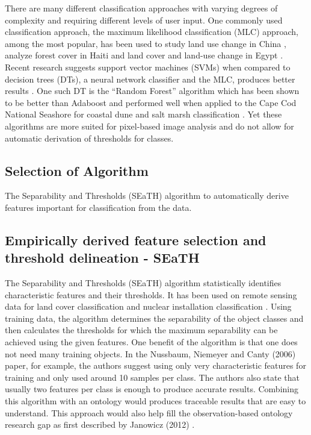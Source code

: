 \documentclass[a4paper,12pt]{article}
\begin{document}
There are many different classification approaches with varying degrees of
complexity and requiring different levels of user input. One commonly used
classification approach, the maximum likelihood classification (MLC) approach,
among the most popular, has been used to study land use change in China
\cite{Ding2007}, analyze forest cover in Haiti \cite{Churches2014} and land
cover and land-use change in Egypt \cite{Shalaby2007}. Recent research suggests
support vector machines (SVMs) when compared to decision trees (DTs), a neural
network classifier and the MLC, produces better results \cite{Huang2002}. One
such DT is the ``Random Forest'' algorithm which has been shown to be better
than Adaboost \cite{Chan2008} and performed well when applied to the Cape Cod
National Seashore for coastal dune and salt marsh classification
\cite{Timm2012}.
Yet these algorithms are more suited for pixel-based image analysis and do not
allow for automatic derivation of thresholds for classes.

\subsection{Selection of Algorithm}
The Separability and Thresholds
(SEaTH) \cite{Nussbaum2006} algorithm to automatically derive features important
for classification from the data.
\subsection{Empirically derived feature selection and threshold delineation -
SEaTH} The Separability and Thresholds (SEaTH) algorithm \cite{Nussbaum2006}
statistically identifies characteristic features and their thresholds. It has
been used on remote sensing data for land cover classification \cite{Gao2011}
and nuclear installation classification \cite{Nussbaum2006}.
Using training data, the algorithm determines the separability of the object
classes and then calculates the thresholds for which the maximum separability
can be achieved using the given features. One benefit of the algorithm is that
one does not need many training objects.
In the Nussbaum, Niemeyer and Canty (2006) paper, for example, the authors
suggest using only very characteristic features for training and only used
around 10 samples per class\cite{Nussbaum2006}. The authors also state that
usually two features per class is enough to produce accurate results. Combining
this algorithm with an ontology would produces traceable results that are easy
to understand. This approach would also help fill the observation-based ontology
research gap as first described by Janowicz (2012) \cite{Janowicz2012}.
\end{document}
